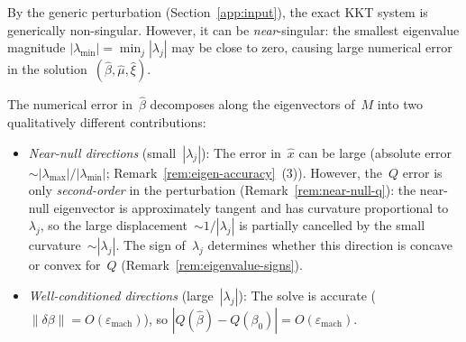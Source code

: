 \begin{remark}%
\label{rem:error-decomposition}
By the generic perturbation (Section~\ref{app:input}),
the exact KKT system is generically non-singular.
However, it can be \emph{near}-singular:
the smallest eigenvalue magnitude
$|\lambda_{\min}| = \min_j |\lambda_j|$ may be close
to zero, causing large numerical error in the
solution~$(\hat\beta, \hat\mu, \hat\xi)$.

The numerical error in~$\hat\beta$ decomposes along the
eigenvectors of~$M$ into two qualitatively different
contributions:
\begin{itemize}
\item \emph{Near-null directions}
  (small~$|\lambda_j|$):
  The error in~$\hat x$ can be large
  (absolute error~$\sim |\lambda_{\max}|/|\lambda_{\min}|$;
  Remark~\ref{rem:eigen-accuracy}~(3)).
  However, the~$Q$ error is only
  \emph{second-order} in the perturbation
  (Remark~\ref{rem:near-null-q}):
  the near-null eigenvector is approximately tangent
  and has curvature proportional to~$\lambda_j$,
  so the large displacement~$\sim 1/|\lambda_j|$
  is partially cancelled by the
  small curvature~$\sim |\lambda_j|$.
  The sign of~$\lambda_j$ determines whether
  this direction is concave or convex for~$Q$
  (Remark~\ref{rem:eigenvalue-signs}).

\item \emph{Well-conditioned directions}
  (large~$|\lambda_j|$):
  The solve is accurate
  ($\|\delta\beta\| = O(\varepsilon_{\mathrm{mach}})$),
  so
  $|Q(\hat\beta) - Q(\beta_0)|
    = O(\varepsilon_{\mathrm{mach}})$.
\end{itemize}
\end{remark}


